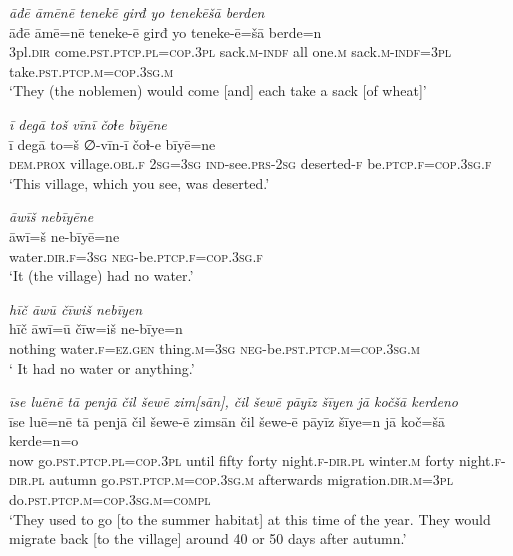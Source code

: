 \ea \label{RE.71}
\textit{āđē āmēnē tenekē girđ yo tenekēšā berden} \\ 
\gll āđē āmē=nē teneke-ē girđ yo teneke-ē=šā berde=n \\ 
 3pl\textsc{.dir} come\textsc{.pst}\textsc{.ptcp}\textsc{.pl}\textsc{=cop}\textsc{.3pl} sack\textsc{.m}\textsc{-indf} all one\textsc{.m} sack\textsc{.m}\textsc{-indf}\textsc{=3pl} take\textsc{.pst}\textsc{.ptcp}\textsc{.m}\textsc{=cop}\textsc{.3sg}\textsc{.m} \\ 
\glt `They (the noblemen) would come [and] each take a sack [of wheat]'
\z 
 
\ea \label{ŽE.4}
\textit{ī degā toš vīnī čoɫe bīyēne} \\ 
\gll ī degā to=š ∅-vīn-ī čoɫ-e bīyē=ne \\ 
 \textsc{dem.prox} village\textsc{.obl}\textsc{\textsc{.f}} \textsc{2sg}\textsc{=3sg} \textsc{ind-}see\textsc{.prs}-\textsc{2sg} deserted-\textsc{f} be\textsc{.ptcp}\textsc{\textsc{.f}}\textsc{=cop}\textsc{.3sg}\textsc{\textsc{.f}} \\ 
\glt `This village, which you see, was deserted.'
\z 
 
\ea \label{ŽE.6}
\textit{āwīš nebīyēne} \\ 
\gll āwī=š ne-bīyē=ne \\ 
 water\textsc{.dir}\textsc{.f}\textsc{=3sg} \textsc{neg-}be\textsc{.ptcp}\textsc{.f}\textsc{=cop}\textsc{.3sg}\textsc{.f} \\ 
\glt `It (the village) had no water.'
\z 
 
\ea \label{ŽE.7}
\textit{hīč āwū čīwiš nebīyen} \\ 
\gll hīč āwī=ū čīw=iš ne-bīye=n \\ 
 nothing water\textsc{.f}\textsc{\textsc{=ez.gen}} thing\textsc{.m}\textsc{=3sg} \textsc{neg-}be\textsc{.pst}\textsc{.ptcp}\textsc{.m}\textsc{=cop}\textsc{.3sg}\textsc{.m} \\ 
\glt ` It had no water or anything.'
\z 
 
\ea \label{ŽE.9}
\textit{īse luēnē tā penjā čil šewē zim[sān], čil šewē pāyīz šīyen jā kočšā kerdeno} \\ 
\gll īse luē=nē tā penjā čil šewe-ē zimsān čil šewe-ē pāyīz šīye=n jā koč=šā kerde=n=o \\ 
 now go\textsc{.pst}\textsc{.ptcp}\textsc{.pl}\textsc{=cop}\textsc{.3pl} until fifty forty night\textsc{.f}\textsc{-dir}\textsc{.pl} winter\textsc{.m} forty night\textsc{.f}\textsc{-dir}\textsc{.pl} autumn go\textsc{.pst}\textsc{.ptcp}\textsc{.m}\textsc{=cop}\textsc{.3sg}\textsc{.m} afterwards migration\textsc{.dir}\textsc{.m}\textsc{=3pl} do\textsc{.pst}\textsc{.ptcp}\textsc{.m}\textsc{=cop}\textsc{.3sg}\textsc{.m}\textsc{=compl} \\ 
\glt `They used to go [to the summer habitat] at this time of the year. They would migrate back [to the village] around 40 or 50 days after autumn.'
\z 
 
